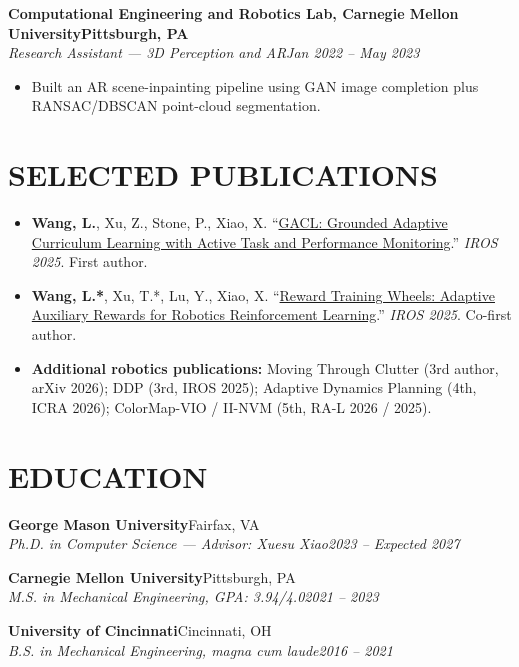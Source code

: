 \documentclass[letterpaper,10pt]{article}
\newcommand{\role}[4]{%
  \textbf{#1}\hfill\textbf{#2}\\[-1pt]
  \textit{#3}\hfill\textit{#4}\par
}
\newcommand{\education}[4]{%
  \textbf{#1}\hfill #2\\[-1pt]
  \textit{#3}\hfill\textit{#4}\par
}
\begin{document}
\role{Computational Engineering and Robotics Lab, Carnegie Mellon University}{Pittsburgh, PA}{Research Assistant --- 3D Perception and AR}{Jan 2022 -- May 2023}
\begin{itemize}
  \item Built an AR scene-inpainting pipeline using GAN image completion plus RANSAC/DBSCAN point-cloud segmentation.
\end{itemize}

\section{SELECTED PUBLICATIONS}
\small
\begin{itemize}
  \item \textbf{Wang, L.}, Xu, Z., Stone, P., Xiao, X. ``\href{https://doi.org/10.1109/IROS60139.2025.11246910}{GACL: Grounded Adaptive Curriculum Learning with Active Task and Performance Monitoring}.'' \textit{IROS 2025}. First author.
  \item \textbf{Wang, L.*}, Xu, T.*, Lu, Y., Xiao, X. ``\href{https://doi.org/10.1109/IROS60139.2025.11247039}{Reward Training Wheels: Adaptive Auxiliary Rewards for Robotics Reinforcement Learning}.'' \textit{IROS 2025}. Co-first author.
  \item \textbf{Additional robotics publications:} Moving Through Clutter (3rd author, arXiv 2026); DDP (3rd, IROS 2025); Adaptive Dynamics Planning (4th, ICRA 2026); ColorMap-VIO / II-NVM (5th, RA-L 2026 / 2025).
\end{itemize}

\section{EDUCATION}
\small
\education{George Mason University}{Fairfax, VA}{Ph.D. in Computer Science --- Advisor: Xuesu Xiao}{2023 -- Expected 2027}
\education{Carnegie Mellon University}{Pittsburgh, PA}{M.S. in Mechanical Engineering, GPA: 3.94/4.0}{2021 -- 2023}
\education{University of Cincinnati}{Cincinnati, OH}{B.S. in Mechanical Engineering, magna cum laude}{2016 -- 2021}
\end{document}
